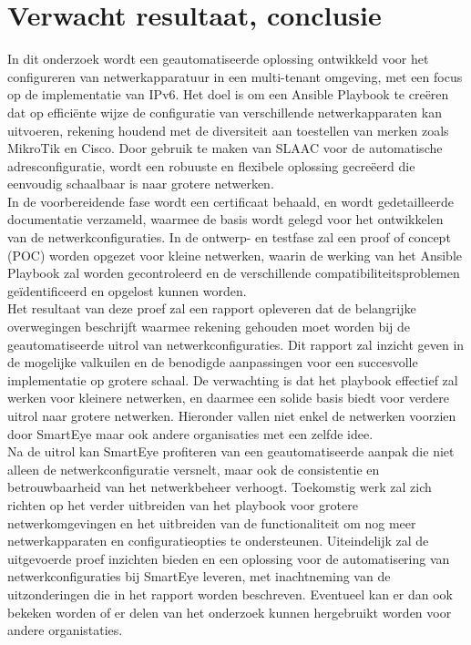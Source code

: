 \section{Verwacht resultaat, conclusie}%
\label{sec:verwachte_resultaten}

In dit onderzoek wordt een geautomatiseerde oplossing ontwikkeld voor het configureren van netwerkapparatuur in een multi-tenant omgeving, met een focus op de implementatie van IPv6. 
Het doel is om een Ansible Playbook te creëren dat op efficiënte wijze de configuratie van verschillende netwerkapparaten kan uitvoeren, rekening houdend met de diversiteit aan toestellen van merken zoals MikroTik en Cisco. 
Door gebruik te maken van SLAAC voor de automatische adresconfiguratie, wordt een robuuste en flexibele oplossing gecreëerd die eenvoudig schaalbaar is naar grotere netwerken.
\\

In de voorbereidende fase wordt een certificaat behaald, en wordt gedetailleerde documentatie verzameld, waarmee de basis wordt gelegd voor het ontwikkelen van de netwerkconfiguraties. 
In de ontwerp- en testfase zal een proof of concept (POC) worden opgezet voor kleine netwerken, waarin de werking van het Ansible Playbook zal worden gecontroleerd en
de verschillende compatibiliteitsproblemen geïdentificeerd en opgelost kunnen worden.
\\

Het resultaat van deze proef zal een rapport opleveren dat de belangrijke overwegingen beschrijft waarmee rekening gehouden moet worden bij de geautomatiseerde uitrol van netwerkconfiguraties. 
Dit rapport zal inzicht geven in de mogelijke valkuilen en de benodigde aanpassingen voor een succesvolle implementatie op grotere schaal. 
De verwachting is dat het playbook effectief zal werken voor kleinere netwerken, en daarmee een solide basis biedt voor verdere uitrol naar grotere netwerken.
Hieronder vallen niet enkel de netwerken voorzien door SmartEye maar ook andere organisaties met een zelfde idee.
\\

Na de uitrol kan SmartEye profiteren van een geautomatiseerde aanpak die niet alleen de netwerkconfiguratie versnelt, maar ook de consistentie en betrouwbaarheid van het netwerkbeheer verhoogt. 
Toekomstig werk zal zich richten op het verder uitbreiden van het playbook voor grotere netwerkomgevingen en het uitbreiden van de functionaliteit om nog meer netwerkapparaten en configuratieopties te ondersteunen. 
Uiteindelijk zal de uitgevoerde proef inzichten bieden en een oplossing voor de automatisering van netwerkconfiguraties bij SmartEye leveren, met inachtneming van de uitzonderingen die in het rapport worden beschreven.
Eventueel kan er dan ook bekeken worden of er delen van het onderzoek kunnen hergebruikt worden voor andere organistaties. 